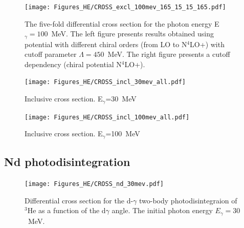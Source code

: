         \begin{figure}[h]
            \begin{center}
                \texttt{[image: Figures\_HE/CROSS\_excl\_100mev\_165\_15\_15\_165.pdf]}
                \end{center}
                \caption{The five-fold differential cross section for the photon 
                energy E$_\gamma=100$~MeV.
                The left figure presents results obtained using potential
                with different chiral orders (from LO to N$^4$LO+) with cutoff parameter $\Lambda=450$~MeV.
                The right figure presents a cutoff dependency (chiral potential N$^4$LO+).}
                \label{CROSS_HE_EXCL_165_15_15_165}
        \end{figure}



        \begin{figure}[h]
            \begin{center}
            \texttt{[image: Figures\_HE/CROSS\_incl\_30mev\_all.pdf]}
            \end{center}
            \caption{Inclusive cross section. E$_\gamma$=30~MeV}
        \end{figure}

        \begin{figure}[h]
            \begin{center}
            \texttt{[image: Figures\_HE/CROSS\_incl\_100mev\_all.pdf]}
            \end{center}
            \caption{Inclusive cross section. E$_\gamma$=100~MeV}
        \end{figure}


\clearpage


\subsection{Nd photodisintegration}

\begin{figure}[h]
    \begin{center}
        \texttt{[image: Figures\_HE/CROSS\_nd\_30mev.pdf]}
        \end{center}
        \caption{Differential cross section for the d-$\gamma$ 
        two-body photodisintegraion of $^3$He as a function of the d$\gamma$ angle.
        The initial photon energy $E_\gamma=30$~MeV.}
        \label{CROSS_nd_30}
    \end{figure}


